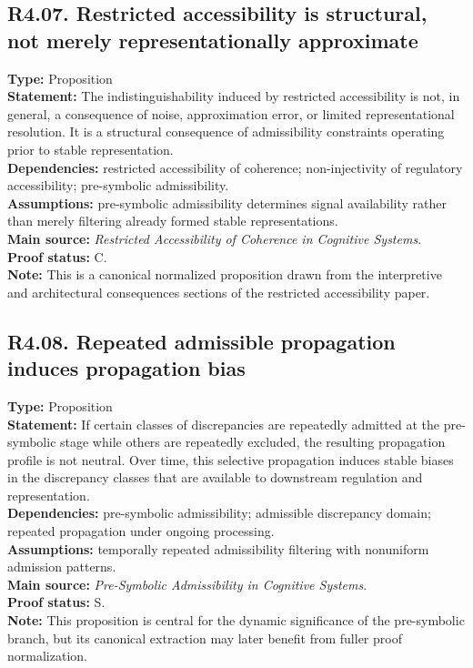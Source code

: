 \documentclass[12pt]{article}
\begin{document}
	\subsection*{R4.07. Restricted accessibility is structural, not merely representationally approximate}
	\textbf{Type:} Proposition \\
	\textbf{Statement:} The indistinguishability induced by restricted accessibility is not, in
	general, a consequence of noise, approximation error, or limited representational resolution.
	It is a structural consequence of admissibility constraints operating prior to stable
	representation. \\
	\textbf{Dependencies:} restricted accessibility of coherence; non-injectivity of regulatory
	accessibility; pre-symbolic admissibility. \\
	\textbf{Assumptions:} pre-symbolic admissibility determines signal availability rather than
	merely filtering already formed stable representations. \\
	\textbf{Main source:} \emph{Restricted Accessibility of Coherence in Cognitive Systems}. \\
	\textbf{Proof status:} C. \\
	\textbf{Note:} This is a canonical normalized proposition drawn from the interpretive and
	architectural consequences sections of the restricted accessibility paper.
	
	\subsection*{R4.08. Repeated admissible propagation induces propagation bias}
	\textbf{Type:} Proposition \\
	\textbf{Statement:} If certain classes of discrepancies are repeatedly admitted at the
	pre-symbolic stage while others are repeatedly excluded, the resulting propagation profile is
	not neutral. Over time, this selective propagation induces stable biases in the discrepancy
	classes that are available to downstream regulation and representation. \\
	\textbf{Dependencies:} pre-symbolic admissibility; admissible discrepancy domain; repeated
	propagation under ongoing processing. \\
	\textbf{Assumptions:} temporally repeated admissibility filtering with nonuniform admission
	patterns. \\
	\textbf{Main source:} \emph{Pre-Symbolic Admissibility in Cognitive Systems}. \\
	\textbf{Proof status:} S. \\
	\textbf{Note:} This proposition is central for the dynamic significance of the pre-symbolic
	branch, but its canonical extraction may later benefit from fuller proof normalization.
	
\end{document}
